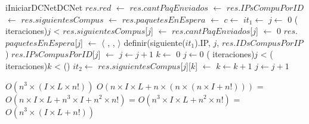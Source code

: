 \begin{Algoritmos}

  \begin{algoritmo}{iIniciarDCNet}{}{DCNet}
    $res$.$red$ $\gets$    
    $res$.$cantPaqEnviados$ $\gets$     
    $res$.$IPsCompuPorID$ $\gets$     
    $res$.$siguientesCompus$ $\gets$     
    $res$.$paquetesEnEspera$ $\gets$     
     $c \gets$    
     $it_{1} \gets$     
     $j \gets$ 0   
    \While( iteraciones){$j$ < }{
      $res$.$siguientesCompus$[$j$] $\gets$     
      $res$.$cantPaqEnviados$[$j$] $\gets$ 0   
      $res$.$paquetesEnEspera$[$j$] $\gets$ $\langle$\vacio{} ,\vacio{} ,\vacio{} $\rangle$   
      definir(siguiente($it_{1}$).IP, $j$, $res$.$IDsCompusPorIP$)   
      $res$.$IPsCompusPorID$[$j$] $\gets$     
      $j \gets j + 1$   
          
    }
     $k \gets$ 0   
    $j \gets 0$   
    \While( iteraciones){$j$ < }{
      \While( iteraciones){$k$ < }{
        \If(){}{
           $it_{2} \gets$  
          $res$.$siguientesCompus$[$j$][$k$] $\gets$  
        }
        $k \gets k + 1 $  
      }
      $j \gets j + 1 $  
    }
  \end{algoritmo}
 \datosAlgoritmo{} %
  {} %
  {} %
  {$O(n^3 \times (I \times L \times n!))$} %
  {$O(n \times I \times L + n \times (n \times (n \times I + n!)))$ = $O(n \times I \times L + n^3 \times I + n^2 \times n!)$ = $O(n^3 \times I \times L + n^2 \times n!)$ = $O(n^3 \times (I \times L + n!))$} %


\end{Algoritmos}
